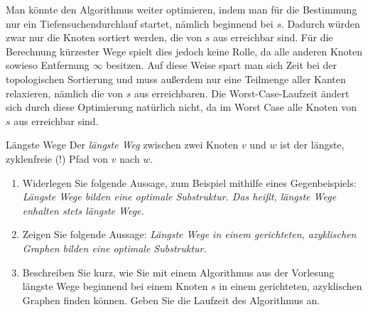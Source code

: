 \documentclass[11pt,a4paper]{article}
\begin{document}
\begin{loesung}
\begin{enumerate}
        Man könnte den Algorithmus weiter optimieren, indem man für die Bestimmung nur ein Tiefensuchendurchlauf startet, nämlich beginnend bei $s$.
        Dadurch würden zwar nur die Knoten sortiert werden, die von $s$ aus erreichbar sind.
        Für die Berechnung kürzester Wege spielt dies jedoch keine Rolle, da alle anderen Knoten sowieso Entfernung $\infty$ besitzen.
        Auf diese Weise spart man sich Zeit bei der topologischen Sortierung und muss außerdem nur eine Teilmenge aller Kanten relaxieren, nämlich die von $s$ aus erreichbaren.
        Die Worst-Case-Laufzeit ändert sich durch diese Optimierung natürlich nicht, da im Worst Case alle Knoten von $s$ aus erreichbar sind.
    \end{enumerate}
\end{loesung}
\begin{aufgabe}{4}{Längste Wege}
    Der \emph{längste Weg} zwischen zwei Knoten $v$ und $w$ ist der längste, zyklenfreie (!) Pfad von $v$ nach $w$.
    \begin{enumerate}[label=\alph*)]
        \item Widerlegen Sie folgende Aussage, zum Beispiel mithilfe eines Gegenbeispiels:
        \emph{Längste Wege bilden eine optimale Substruktur. Das heißt, längste Wege enhalten stets längste Wege.}
        \item\label{longest_path_dag}Zeigen Sie folgende Aussage:
        \emph{Längste Wege in einem gerichteten, azyklischen Graphen bilden eine optimale Substruktur.}
        \item Beschreiben Sie kurz, wie Sie mit einem Algorithmus aus der Vorlesung längste Wege beginnend bei einem Knoten $s$ in einem gerichteten, azyklischen Graphen finden können.
        Geben Sie die Laufzeit des Algorithmus an.
    \end{enumerate}
\end{aufgabe}
\end{document}
